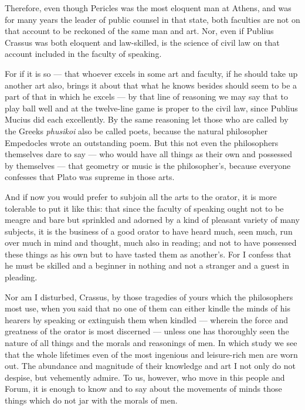  Therefore, even though Pericles was the most eloquent man at Athens, and was for many years the leader of public counsel in that state, both faculties are not on that account to be reckoned of the same man and art. Nor, even if Publius Crassus was both eloquent and law-skilled, is the science of civil law on that account included in the faculty of speaking.

 For if it is so — that whoever excels in some art and faculty, if he should take up another art also, brings it about that what he knows besides should seem to be a part of that in which he excels — by that line of reasoning we may say that to play ball well and at the twelve-line game is proper to the civil law, since Publius Mucius did each excellently. By the same reasoning let those who are called by the Greeks \textit{phusikoi} also be called poets, because the natural philosopher Empedocles wrote an outstanding poem. But this not even the philosophers themselves dare to say — who would have all things as their own and possessed by themselves — that geometry or music is the philosopher's, because everyone confesses that Plato was supreme in those arts.

 And if now you would prefer to subjoin all the arts to the orator, it is more tolerable to put it like this: that since the faculty of speaking ought not to be meagre and bare but sprinkled and adorned by a kind of pleasant variety of many subjects, it is the business of a good orator to have heard much, seen much, run over much in mind and thought, much also in reading; and not to have possessed these things as his own but to have tasted them as another's. For I confess that he must be skilled and a beginner in nothing and not a stranger and a guest in pleading.

 Nor am I disturbed, Crassus, by those tragedies of yours which the philosophers most use, when you said that no one of them can either kindle the minds of his hearers by speaking or extinguish them when kindled — wherein the force and greatness of the orator is most discerned — unless one has thoroughly seen the nature of all things and the morals and reasonings of men. In which study we see that the whole lifetimes even of the most ingenious and leisure-rich men are worn out. The abundance and magnitude of their knowledge and art I not only do not despise, but vehemently admire. To us, however, who move in this people and Forum, it is enough to know and to say about the movements of minds those things which do not jar with the morals of men.

